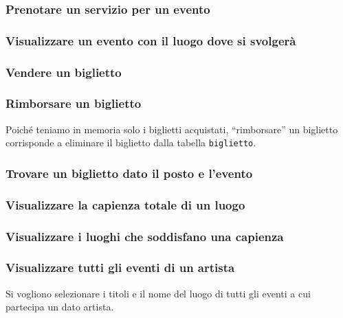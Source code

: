 \documentclass[a4paper,11pt]{article}
\begin{document}
\subsubsection{Prenotare un servizio per un evento}


\subsubsection{Visualizzare un evento con il luogo dove si svolgerà}


\subsubsection{Vendere un biglietto}


\subsubsection{Rimborsare un biglietto}

Poiché teniamo in memoria solo i biglietti acquistati, ``rimborsare'' un biglietto corrisponde a eliminare il biglietto dalla tabella \texttt{biglietto}.



\subsubsection{Trovare un biglietto dato il posto e l'evento}


\subsubsection{Visualizzare la capienza totale di un luogo}


\subsubsection{Visualizzare i luoghi che soddisfano una capienza}


\subsubsection{Visualizzare tutti gli eventi di un artista}
Si vogliono selezionare i titoli e il nome del luogo di tutti gli eventi a cui
partecipa un dato artista.

\end{document}
